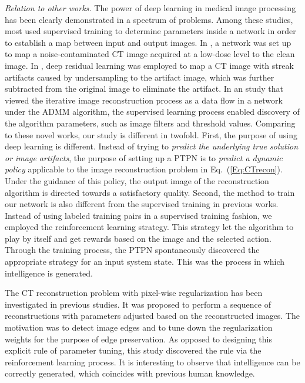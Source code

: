 \documentclass[journal]{IEEEtran}
\begin{document}
\emph{Relation to other works.} The power of deep learning in medical image processing has been clearly demonstrated in a spectrum of problems. Among these studies, most used supervised training to determine parameters inside a network in order to establish a map between input and output images. In \cite{Chen:BOE:2017,Chen:TMI:2017}, a network was set up to map a noise-contaminated CT image acquired at a low-dose level to the clean image. In \cite{Han:CoRR:2016}, deep residual learning was employed to map a CT image with streak artifacts caused by undersampling to the artifact image, which was further subtracted from the original image to eliminate the artifact. In an study \cite{Yang:ANIPS:2016} that viewed the iterative image reconstruction process as a data flow in a network under the ADMM algorithm, the supervised learning process enabled discovery of the algorithm parameters, such as image filters and threshold values. Comparing to these novel works, our study is different in twofold. First, the purpose of using deep learning is different. Instead of trying to \emph{predict the underlying true solution or image artifacts}, the purpose of setting up a PTPN is to \emph{predict a dynamic policy} applicable to the image reconstruction problem in Eq.~(\ref{Eq:CTrecon}). Under the guidance of this policy, the output image of the reconstruction algorithm is directed towards a satisfactory quality. Second, the method to train our network is also different from the supervised training in previous works. Instead of using labeled training pairs in a supervised training fashion, we employed the reinforcement learning strategy. This strategy let the algorithm to play by itself and get rewards based on the image and the selected action. Through the training process, the PTPN spontaneously discovered the appropriate strategy for an input system state. This was the process in which intelligence is generated. 

The CT reconstruction problem with pixel-wise regularization has been investigated in previous studies\cite{Guo:SPIE:2010,Tian:PMB:2011}. It was proposed to perform a sequence of reconstructions with parameters adjusted based on the reconstructed images. The motivation was to detect image edges and to tune down the regularization weights for the purpose of edge preservation. As opposed to designing this explicit rule of parameter tuning, this study discovered the rule via the reinforcement learning process. It is interesting to observe that intelligence can be correctly generated, which coincides with previous human knowledge.
\end{document}
